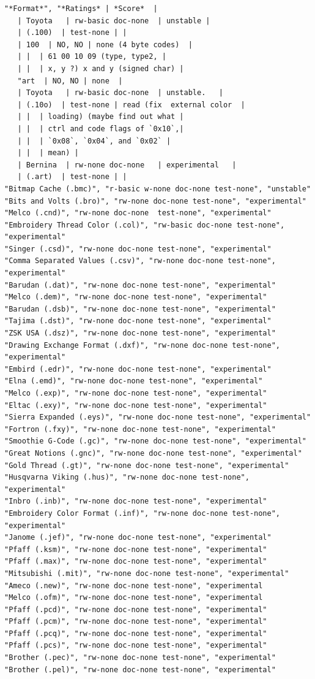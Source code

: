 \documentclass[11pt]{report}
\begin{document}
\begin{verbatim}
"*Format*", "*Ratings* | *Score*  |
   | Toyota   | rw-basic doc-none  | unstable | 
   | (.100)  | test-none | |
   | 100  | NO, NO | none (4 byte codes)  |
   | |  | 61 00 10 09 (type, type2, |
   | |  | x, y ?) x and y (signed char) |
   "art  | NO, NO | none  |
   | Toyota   | rw-basic doc-none  | unstable.   |
   | (.10o)  | test-none | read (fix  external color  |
   | |  | loading) (maybe find out what |
   | |  | ctrl and code flags of `0x10`,|
   | |  | `0x08`, `0x04`, and `0x02` |
   | |  | mean) |
   | Bernina  | rw-none doc-none   | experimental   |
   | (.art)  | test-none | |
"Bitmap Cache (.bmc)", "r-basic w-none doc-none test-none", "unstable" 
"Bits and Volts (.bro)", "rw-none doc-none test-none", "experimental"
"Melco (.cnd)", "rw-none doc-none  test-none", "experimental"
"Embroidery Thread Color (.col)", "rw-basic doc-none test-none", "experimental"
"Singer (.csd)", "rw-none doc-none test-none", "experimental"
"Comma Separated Values (.csv)", "rw-none doc-none test-none", "experimental"
"Barudan (.dat)", "rw-none doc-none test-none", "experimental"
"Melco (.dem)", "rw-none doc-none test-none", "experimental"
"Barudan (.dsb)", "rw-none doc-none test-none", "experimental"
"Tajima (.dst)", "rw-none doc-none test-none", "experimental"
"ZSK USA (.dsz)", "rw-none doc-none test-none", "experimental"
"Drawing Exchange Format (.dxf)", "rw-none doc-none test-none", "experimental"
"Embird (.edr)", "rw-none doc-none test-none", "experimental"
"Elna (.emd)", "rw-none doc-none test-none", "experimental"
"Melco (.exp)", "rw-none doc-none test-none", "experimental"
"Eltac (.exy)", "rw-none doc-none test-none", "experimental"
"Sierra Expanded (.eys)", "rw-none doc-none test-none", "experimental"
"Fortron (.fxy)", "rw-none doc-none test-none", "experimental"
"Smoothie G-Code (.gc)", "rw-none doc-none test-none", "experimental"
"Great Notions (.gnc)", "rw-none doc-none test-none", "experimental"
"Gold Thread (.gt)", "rw-none doc-none test-none", "experimental"
"Husqvarna Viking (.hus)", "rw-none doc-none test-none", "experimental"
"Inbro (.inb)", "rw-none doc-none test-none", "experimental"
"Embroidery Color Format (.inf)", "rw-none doc-none test-none", "experimental"
"Janome (.jef)", "rw-none doc-none test-none", "experimental"
"Pfaff (.ksm)", "rw-none doc-none test-none", "experimental"
"Pfaff (.max)", "rw-none doc-none test-none", "experimental"
"Mitsubishi (.mit)", "rw-none doc-none test-none", "experimental"
"Ameco (.new)", "rw-none doc-none test-none", "experimental
"Melco (.ofm)", "rw-none doc-none test-none", "experimental
"Pfaff (.pcd)", "rw-none doc-none test-none", "experimental"
"Pfaff (.pcm)", "rw-none doc-none test-none", "experimental"
"Pfaff (.pcq)", "rw-none doc-none test-none", "experimental"
"Pfaff (.pcs)", "rw-none doc-none test-none", "experimental"
"Brother (.pec)", "rw-none doc-none test-none", "experimental"
"Brother (.pel)", "rw-none doc-none test-none", "experimental"


\end{verbatim}
\end{document}
